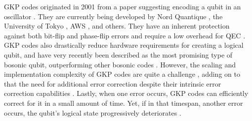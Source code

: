 GKP codes originated in 2001 from a paper suggesting encoding a qubit in an oscillator \cite{gottesman-2001}. They are currently being developed by Nord Quantique \cite{nord-UANTIQUE}, the University of Tokyo \cite{konno-2024}, AWS \cite{noh-2022}, and others. They have an inherent protection against both bit-flip and phase-flip errors and require a low overhead for QEC \cite{noh-2022}. GKP codes also drastically reduce hardware requirements for creating a logical qubit, and have very recently been described as the most promising type of bosonic qubit, outperforming other bosonic codes \cite{lemonde-2024}. However, the scaling and implementation complexity of GKP codes are quite a challenge \cite{grimsmo-2021}, adding on to that the need for additional error correction despite their intrinsic error correction capabilities \cite{noh-2022}. Lastly, when one error occurs, GKP codes can efficiently correct for it in a small amount of time. Yet, if in that timespan, another error occurs, the qubit's logical state progressively deteriorates \cite{nord-quantique}.
